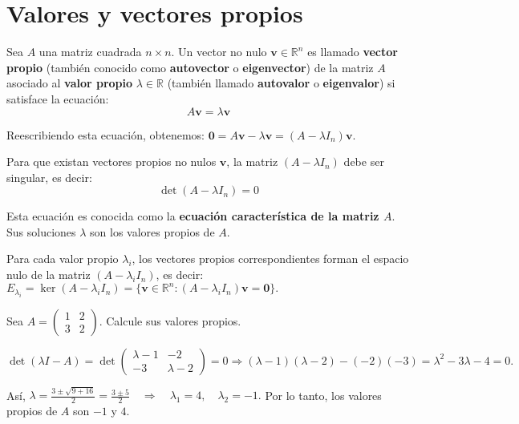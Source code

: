 \chapter{Valores y vectores propios}

\begin{definition}
	Sea $A$ una matriz cuadrada $n\times n$. Un vector no nulo $\mathbf{v}\in \mathbb{R}^n$ es llamado \textbf{vector propio} (también conocido como \textbf{autovector} o \textbf{eigenvector}) de la matriz $A$ asociado al \textbf{valor propio} $\lambda \in \mathbb{R}$ (también llamado \textbf{autovalor} o \textbf{eigenvalor}) si satisface la ecuación:
	$$\boxed{A\mathbf{v} = \lambda \mathbf{v}}$$
	
	Reescribiendo esta ecuación, obtenemos: $\mathbf{0} = A\mathbf{v} - \lambda \mathbf{v} = (A - \lambda I_n)\mathbf{v}.$
	
	Para que existan vectores propios no nulos $\mathbf{v}$, la matriz $(A - \lambda I_n)$ debe ser singular, es decir:
	$$\det(A - \lambda I_n) = 0$$
	
	Esta ecuación es conocida como la \textbf{ecuación característica de la matriz $A$}. Sus soluciones $\lambda$ son los valores propios de $A$.
	
	Para cada valor propio $\lambda_i$, los vectores propios correspondientes forman el espacio nulo de la matriz $(A - \lambda_i I_n)$, es decir: $E_{\lambda_i} = \ker(A - \lambda_i I_n) = \{\mathbf{v} \in \mathbb{R}^n : (A - \lambda_i I_n)\mathbf{v} = \mathbf{0}\}.$
\end{definition}

\begin{example}\label{ex:ejemplovvp}
	Sea $A = \begin{pmatrix} 1 & 2 \\ 3 & 2 \end{pmatrix}$. Calcule sus valores propios.
	\begin{myproof}
	\(	\det(\lambda I - A) = \det\begin{pmatrix} \lambda - 1 & -2 \\ -3 & \lambda - 2 \end{pmatrix} = 0 \Rightarrow (\lambda - 1)(\lambda - 2) - (-2)(-3) = \lambda^2 - 3\lambda - 4 = 0.\)
	
	Así, \(\lambda = \frac{3 \pm \sqrt{9 + 16}}{2} = \frac{3 \pm 5}{2} \quad \Rightarrow \quad \lambda_1 = 4, \quad \lambda_2 = -1.	\) 	Por lo tanto, los valores propios de $A$ son $-1$ y $4$.
\end{myproof} 	
	
\end{example}

